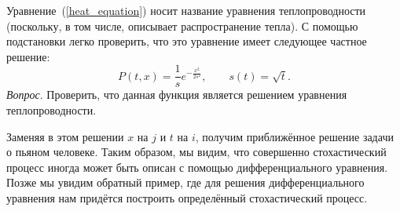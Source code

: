 \documentclass{book}
\begin{document}
Уравнение~(\ref{heat_equation}) носит название уравнения теплопроводности (поскольку, в том числе,
описывает распространение тепла). С помощью подстановки легко проверить, что это уравнение имеет
следующее частное решение:
\begin{equation}
    P(t, x) = \frac{1}{s} e^{-\frac{x^2}{2 s^2}}, \qquad s(t) = \sqrt{t}.
\end{equation}
\textit{Вопрос}. Проверить, что данная функция является решением уравнения теплопроводности.

Заменяя в этом решении $x$ на $j$ и $t$ на $i$, получим приближённое решение задачи о пьяном человеке. Таким
образом, мы видим, что совершенно стохастический процесс иногда может быть описан с помощью
дифференциального уравнения. Позже мы увидим обратный пример, где для решения дифференциального
уравнения нам придётся построить определённый стохастический процесс.
\end{document}
